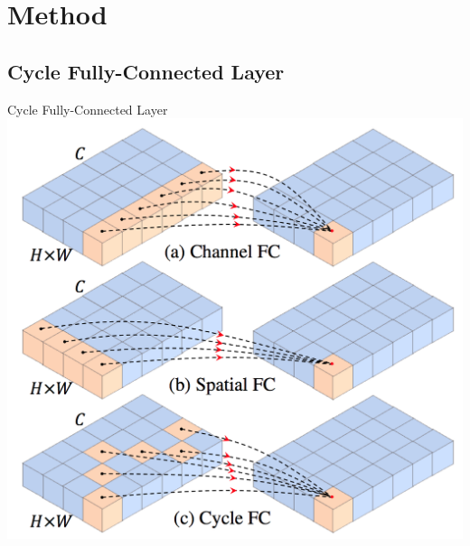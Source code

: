 \documentclass{beamer}
\begin{document}
\section{Method}

\subsection{Cycle Fully-Connected Layer}

\begin{frame}{Cycle Fully-Connected Layer}
    \centering
    \includegraphics[height=.8\textheight]{figures/teaser.png}
\end{frame}
\end{document}
